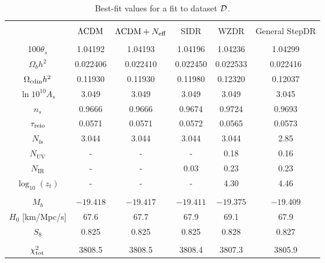 \documentclass[aps,prd,twocolumn,nofootinbib,superscriptaddress]{revtex4}
\newcommand{\D}{\cal{D}}
\newcommand{\nir}{N_\text{IR}}
\newcommand{\nuv}{N_\text{UV}}
\newcommand{\nfs}{N_\text{fs}}
\newcommand{\zt}{z_t}
\newcommand{\Neff}{N_{\rm eff}}
\begin{document}
\begin{table*}[h!]{ }
	\centering
	\begin{tabular}{|c | c | c | c | c | c |} 
		\hline &&&&&\\[-8pt]
		& $\Lambda{\rm CDM}$ & $ \Lambda{\rm CDM} + \Neff$ & SIDR &  WZDR & General StepDR  \\
		\hline &&&&&\\[-8pt]
		100$\theta_s$ &1.04192&1.04193&1.04196&1.04236&1.04299  \\  [3pt]
		$\Omega_b h^2$ &0.022406&0.022410&0.022450&0.022533& 0.022416   \\ [3pt]
		$ \Omega_{\rm cdm}h^2$ & 0.11930&0.11930&0.11980&0.12320&0.12037 \\ [3pt]
		$\ln 10^{10} A_s$  &3.049 &3.049&3.049&3.049& 3.045 \\ [3pt]
		$n_s$ & 0.9666&0.9666&0.9674&0.9724&0.9693 \\ [3pt]
		$\tau_{\rm reio}$ &0.0571 &0.0571&0.0572&0.0565&0.0573 \\ [3pt]
		$\nfs   $  &3.044 & 3.044 &3.044&3.044&2.85 \\ [3pt]
		$\nuv $  &-&-&-& 0.18 & 0.16 \\ [3pt]			
		$\nir $  & -&-& 0.03 & 0.23 & 0.23   \\ [3pt]
		$\log_{10} (\zt)$  &- &- &- &4.30 &4.46  \\ [3pt] \hline  &&&&&\\[-8pt]	
		$M_b $ &${-19.418}$ &${-19.417}$ &${-19.411}$&${-19.375}$& ${-19.409}$\\ [3pt]
		$H_0$ [km/Mpc/s] & 67.6 &67.7 &67.9&69.1& 67.9\\ [3pt]
		$S_8$ &0.825&0.825&0.825 &0.828& 0.827 \\  [3pt] \hline &&&&&\\[-8pt]
		$\chi^2_{\rm tot}$  & 3808.5 & 3808.5 & 3808.4 &  3807.3 & 3805.9\\ 
		\hline
		
	\end{tabular}
	\caption{Best-fit values for a fit to dataset $\D$.}
	\label{tb:bestfitD}
\end{table*}
\end{document}
